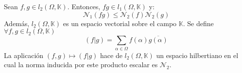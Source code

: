 \documentclass[12pt]{report}
\theoremstyle{largebreak}
\newcommand\pint[2]{\ensuremath{\left(#1\big| #2\right)}}
\newcommand\conj[1]{\ensuremath{\overline{#1}}}
\begin{document}
    \begin{theor}
        Sean $f,g\in l_2(\Omega,\mathbb{K})$. Entonces, $fg \in l_1(\Omega,\mathbb{K})$ y:
        \begin{equation*}
            \mathcal{N}_1(fg)\leq\mathcal{N}_2(f)\mathcal{N}_2(g)
        \end{equation*}
        Además, $l_2(\Omega,\mathbb{K})$ es un espacio vectorial sobre el campo $\mathbb{K}$. Se define $\forall f,g\in l_2(\Omega,\mathbb{K})$
        \begin{equation*}
            \pint{f}{g}=\sum_{\alpha\in\Omega}f(\alpha)\conj{g(\alpha)}
        \end{equation*}
        La aplicación $(f,g)\mapsto\pint{f}{g}$ hace de $l_2(\Omega,\mathbb{K})$ un espacio hilbertiano en el cual la norma inducida por este producto escalar es $\mathcal{N}_2$.
    \end{theor}
\end{document}
